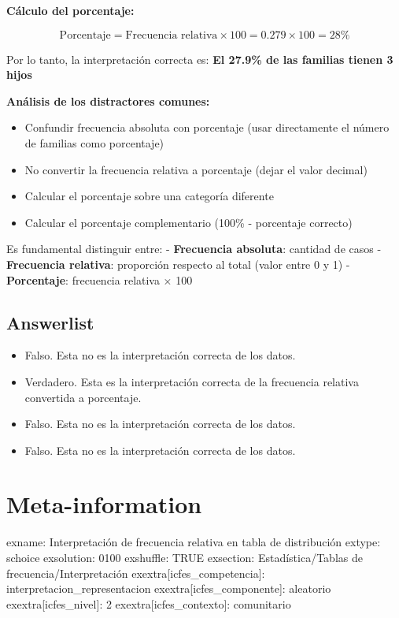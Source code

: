 \documentclass[
]{article}
\providecommand{\tightlist}{%
  \setlength{\itemsep}{0pt}\setlength{\parskip}{0pt}}
\begin{document}
\textbf{Cálculo del porcentaje:}

\[\text{Porcentaje} = \text{Frecuencia relativa} \times 100 = 0.279 \times 100 = 28\%\]

Por lo tanto, la interpretación correcta es: \textbf{El 27.9\% de las
familias tienen 3 hijos}

\textbf{Análisis de los distractores comunes:}

\begin{itemize}
\tightlist
\item
  Confundir frecuencia absoluta con porcentaje (usar directamente el
  número de familias como porcentaje)
\item
  No convertir la frecuencia relativa a porcentaje (dejar el valor
  decimal)
\item
  Calcular el porcentaje sobre una categoría diferente
\item
  Calcular el porcentaje complementario (100\% - porcentaje correcto)
\end{itemize}

Es fundamental distinguir entre: - \textbf{Frecuencia absoluta}:
cantidad de casos - \textbf{Frecuencia relativa}: proporción respecto al
total (valor entre 0 y 1) - \textbf{Porcentaje}: frecuencia relativa ×
100

\subsection{Answerlist}\label{answerlist-1}

\begin{itemize}
\tightlist
\item
  Falso. Esta no es la interpretación correcta de los datos.
\item
  Verdadero. Esta es la interpretación correcta de la frecuencia
  relativa convertida a porcentaje.
\item
  Falso. Esta no es la interpretación correcta de los datos.
\item
  Falso. Esta no es la interpretación correcta de los datos.
\end{itemize}

\section{Meta-information}\label{meta-information}

exname: Interpretación de frecuencia relativa en tabla de distribución
extype: schoice exsolution: 0100 exshuffle: TRUE exsection:
Estadística/Tablas de frecuencia/Interpretación
exextra{[}icfes\_competencia{]}: interpretacion\_representacion
exextra{[}icfes\_componente{]}: aleatorio exextra{[}icfes\_nivel{]}: 2
exextra{[}icfes\_contexto{]}: comunitario
\end{document}
